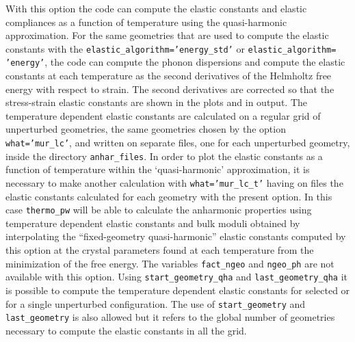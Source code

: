 \documentclass[12pt,a4paper,twoside]{report}
\begin{document}
With this option the code can compute the elastic constants and elastic
compliances as a function of temperature using the quasi-harmonic
approximation. For the same geometries that are used to compute the
elastic constants with the \texttt{elastic\_algorithm='energy\_std'} or
\texttt{elastic\_algorithm=}
\texttt{'energy'}, the code can compute the phonon 
dispersions and compute the elastic constants at each temperature 
as the second derivatives of the Helmholtz free energy 
with respect to strain. The second derivatives are corrected so that
the stress-strain elastic constants are shown in the plots and in output. 
The temperature dependent elastic constants are calculated on a regular 
grid of unperturbed geometries, the same geometries chosen by the option
\texttt{what='mur\_lc'}, and written on separate files, one for
each unperturbed geometry, inside the directory \texttt{anhar\_files}.
In order to plot the elastic constants as a function of temperature 
within the `quasi-harmonic' approximation,
it is necessary to make another calculation with \texttt{what='mur\_lc\_t'} 
having on files the elastic constants calculated for each geometry 
with the present option. 
In this case \texttt{thermo\_pw} will be able to calculate the anharmonic 
properties using temperature dependent elastic constants and bulk moduli 
obtained by interpolating the ``fixed-geometry quasi-harmonic'' elastic 
constants computed by this option at the crystal parameters found at 
each temperature from the minimization of the free energy. 
The variables \texttt{fact\_ngeo} and \texttt{ngeo\_ph} are not 
available with this option. 
Using \texttt{start\_geometry\_qha} and \texttt{last\_geometry\_qha} it is
possible to compute the temperature dependent elastic constants for
selected or for a single unperturbed configuration. 
The use of \texttt{start\_geometry} and \texttt{last\_geometry} is
also allowed but it refers to the global number of geometries necessary 
to compute the elastic constants in all the grid. 
\end{document}
